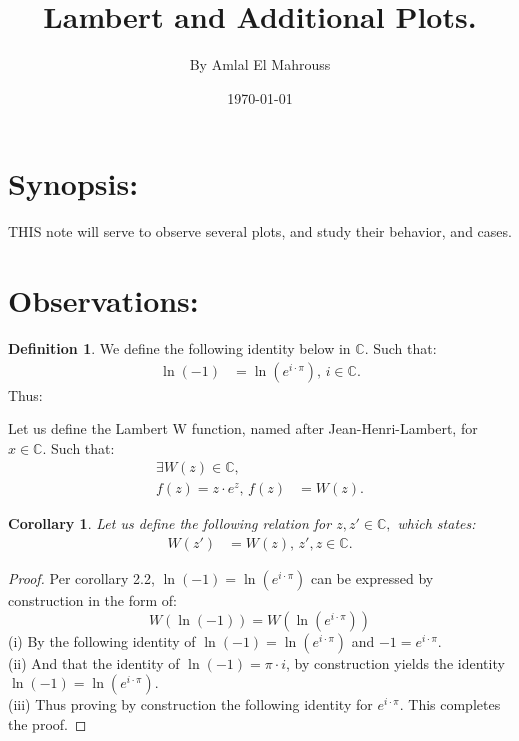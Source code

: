 \documentclass[10pt]{article}
\title{%
	\vspace{-1.5em}%
	\large\textbf{Lambert and Additional Plots.}%
}
\author{By Amlal El Mahrouss}
\date{\today}
\theoremstyle{plain}
\newtheorem{corollary}[theorem]{Corollary}
\theoremstyle{definition}
\newtheorem{definition}[theorem]{Definition}
\theoremstyle{remark}
\begin{document}

\maketitle
\tableofcontents
\newpage

\section{Synopsis:}

\lettrine[lines=1, lhang=0.1, loversize=0.2]{T}HIS note will serve to observe several plots, and study their behavior, and cases.

\section{Observations:}

\begin{definition}
	We define the following identity below in $\mathbb{C}.$ Such that:
	\begin{align*}
		\ln(-1)&=\ln(e^{i \cdot \pi}), \, i \in \mathbb{C}.
	\end{align*}
	Thus:
	\begin{center}
	\end{center}
	Let us define the Lambert W function, named after Jean-Henri-Lambert, for $x \in \mathbb{C}.$ Such that:
	\begin{align*}
		\exists W(z) \in \mathbb{C},\\
		f(z) = z \cdot e^{z}, \, f(z) &= W(z).
	\end{align*}
\end{definition}

\begin{corollary}
	Let us define the following relation for $z, z' \in \mathbb{C},$ which states:
	\begin{align*}
		W(z') &= W(z), \, z', z \in \mathbb{C}.
	\end{align*}
\end{corollary}

\begin{proof}
	Per corollary 2.2, $\ln(-1)=\ln(e^{i \cdot \pi})$ can be expressed by construction in the form of:
	\begin{equation}
		W(\ln(-1)) = W(\ln(e^{i \cdot \pi}))
	\end{equation}
	(i) By the following identity of $\ln(-1)=\ln(e^{i \cdot \pi})$ and $-1 = e^{i \cdot \pi}.$\\
	(ii) And that the identity of $\ln(-1) = \pi \cdot i$, by construction yields the identity $\ln(-1) = \ln(e^{i \cdot \pi}).$\\
	(iii) Thus proving by construction the following identity for $e^{i \cdot \pi}$. This completes the proof.
\end{proof}
\end{document}
